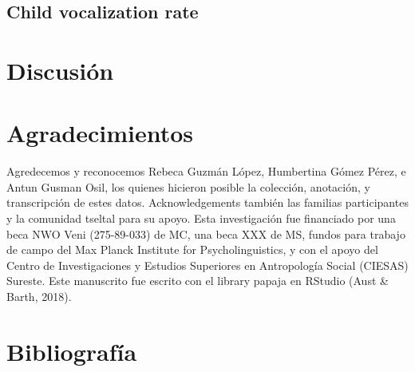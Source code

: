 \documentclass[
  english,
  ,man,floatsintext]{apa6}
\begin{document}
\hypertarget{child-vocalization-rate}{%
\subsection{Child vocalization rate}\label{child-vocalization-rate}}

\hypertarget{discusiuxf3n}{%
\section{Discusión}\label{discusiuxf3n}}

\hypertarget{acknowledgements}{%
\section{Agradecimientos}\label{acknowledgements}}

Agredecemos y reconocemos Rebeca Guzmán López, Humbertina Gómez Pérez, e Antun Gusman Osil, los quienes hicieron posible la colección, anotación, y transcripción de estes datos. Acknowledgements también las familias participantes y la comunidad tseltal para su apoyo. Esta investigación fue financiado por una beca NWO Veni (275-89-033) de MC, una beca XXX de MS, fundos para trabajo de campo del Max Planck Institute for Psycholinguistics, y con el apoyo del Centro de Investigaciones y Estudios Superiores en Antropología Social (CIESAS) Sureste. Este manuscrito fue escrito con el library papaja en RStudio (Aust \& Barth, 2018).

\newpage

\hypertarget{refs}{%
\section{Bibliografía}\label{refs}}

\begingroup
\setlength{\parindent}{-0.5in}
\setlength{\leftskip}{0.5in}
\end{document}
